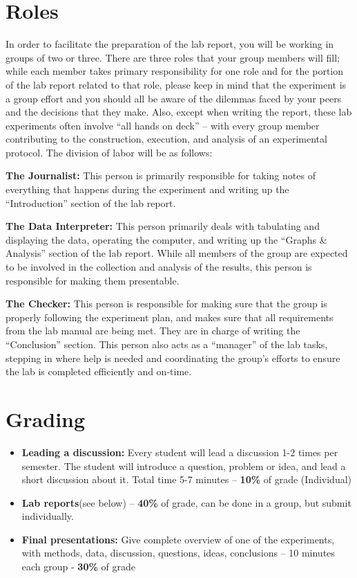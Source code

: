 \section*{Roles}
In order to facilitate the preparation of the lab report, you will be working in groups of two or three.  There are three roles that your group members will fill; while each member takes primary responsibility for one role and for the portion of the lab report related to that role, please keep in mind that the experiment is a group effort and you should all be aware of the dilemmas faced by your peers and the decisions that they make.  Also, except when writing the report, these lab experiments often involve ``all hands on deck'' -- with every group member contributing to the construction, execution, and analysis of an experimental protocol.  The division of labor will be as follows:
\begin{list}{}{\itemsep=1pt} %
\item \textbf{The Journalist:} This person is primarily responsible for taking notes of everything that happens during the experiment and writing up the ``Introduction'' section of the lab report.
 
\item \textbf{The Data Interpreter:} This person primarily deals with tabulating and displaying the data, operating the computer, and writing up the ``Graphs \& Analysis'' section of the lab report. While all members of the group are expected to be involved in the collection and analysis of the results, this person is responsible for making them presentable.
 
\item \textbf{The Checker:} This person is responsible for making sure that the group is properly following the experiment plan, and makes sure that all requirements from the lab manual are being met. They are in charge of writing the ``Conclusion'' section. This person also acts as a ``manager'' of the lab tasks, stepping in where help is needed and coordinating the group's efforts to ensure the lab is completed efficiently and on-time.
\end{list}

\newpage

\section*{Grading}
\begin{itemize}
\item \textbf{ Leading a discussion:} Every student will lead a discussion 1-2 times per semester. The student will introduce a question, problem or idea, and lead a short discussion about it. Total time 5-7 minutes – \textbf{10\%} of grade (Individual)
\item \textbf{Lab reports}(see below) – \textbf{40\%} of grade, can be done in a group, but submit individually.
\item \textbf{Final presentations:} Give complete overview of one of the experiments, with methods, data, discussion, questions, ideas, conclusions – 10 minutes each group - \textbf{30\%} of grade
\end{itemize}

